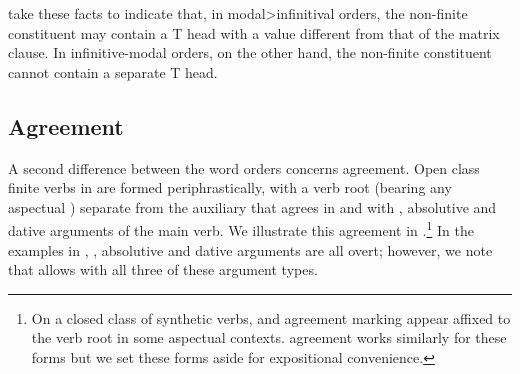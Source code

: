 \documentclass[output=paper]{langscibook}
\begin{document}
\ea 
{}
\z\z

\citet{etxepare-uribeetxebarria2009, etxepare-uribeetxebarria2012} take these facts to indicate that, in mo\-dal>in\-fin\-i\-ti\-val orders, the non-finite constituent may contain a T head with a  value different from that of the matrix clause.  In infinitive-modal orders, on the other hand, the non-finite constituent cannot contain a separate T head.

\subsection{Agreement}
A second difference between the word orders concerns agreement.  Open class finite verbs in  are formed periphrastically, with a verb root (bearing any aspectual ) separate from the auxiliary that agrees in  and  with , absolutive and dative arguments of the main verb.  We illustrate this agreement in .\footnote{On a closed class of synthetic verbs,  and agreement marking appear affixed to the verb root in some aspectual contexts.   agreement works similarly for these forms but we set these forms aside for expositional convenience.} In the examples in , , absolutive and dative arguments are all overt; however, we note that  allows  with all three of these argument types. 
 
\end{document}
